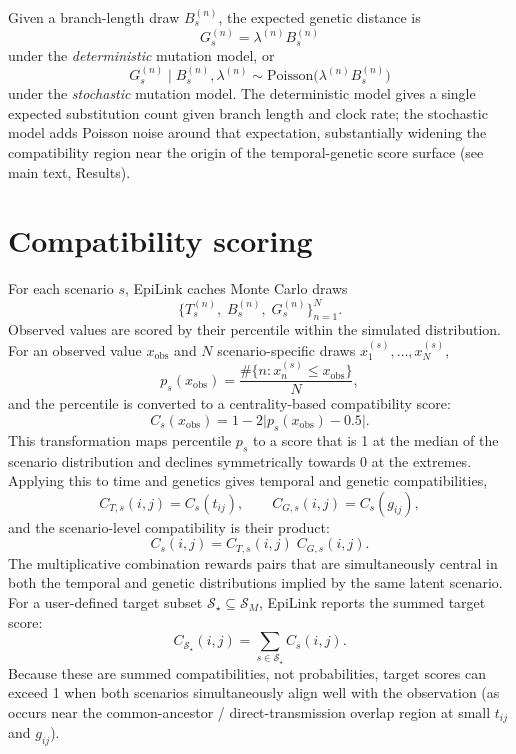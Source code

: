 \documentclass[11pt,a4paper]{article}
\begin{document}
Given a branch-length draw $B_s^{(n)}$, the expected genetic distance is
\[
G_s^{(n)} = \lambda^{(n)} B_s^{(n)}
\]
under the \emph{deterministic} mutation model, or
\[
G_s^{(n)} \mid B_s^{(n)}, \lambda^{(n)}
\sim \mathrm{Poisson}\!\bigl(\lambda^{(n)} B_s^{(n)}\bigr)
\]
under the \emph{stochastic} mutation model. The deterministic model gives a single expected substitution count given branch length and clock rate; the stochastic model adds Poisson noise around that expectation, substantially widening the compatibility region near the origin of the temporal-genetic score surface (see main text, Results).

\section{Compatibility scoring}
\label{sec:S1_scoring}

For each scenario $s$, EpiLink caches Monte Carlo draws
\[
\bigl\{T_s^{(n)},\; B_s^{(n)},\; G_s^{(n)}\bigr\}_{n=1}^{N}.
\]
Observed values are scored by their percentile within the simulated distribution. For an observed value $x_{\mathrm{obs}}$ and $N$ scenario-specific draws $x_1^{(s)},\ldots,x_N^{(s)}$,
\[
p_s(x_{\mathrm{obs}})
= \frac{\#\bigl\{n : x_n^{(s)} \le x_{\mathrm{obs}}\bigr\}}{N},
\]
and the percentile is converted to a centrality-based compatibility score:
\[
C_s(x_{\mathrm{obs}})
= 1 - 2\bigl|p_s(x_{\mathrm{obs}}) - 0.5\bigr|.
\]
This transformation maps percentile $p_s$ to a score that is 1 at the median of the scenario distribution and declines symmetrically towards 0 at the extremes. Applying this to time and genetics gives temporal and genetic compatibilities,
\[
C_{T,s}(i,j) = C_s(t_{ij}), \qquad
C_{G,s}(i,j) = C_s(g_{ij}),
\]
and the scenario-level compatibility is their product:
\[
C_s(i,j) = C_{T,s}(i,j)\; C_{G,s}(i,j).
\]
The multiplicative combination rewards pairs that are simultaneously central in both the temporal and genetic distributions implied by the same latent scenario. For a user-defined target subset $\mathcal{S}_\star \subseteq \mathcal{S}_M$, EpiLink reports the summed target score:
\[
C_{\mathcal{S}_\star}(i,j) = \sum_{s \in \mathcal{S}_\star} C_s(i,j).
\]
Because these are summed compatibilities, not probabilities, target scores can exceed 1 when both scenarios simultaneously align well with the observation (as occurs near the common-ancestor / direct-transmission overlap region at small $t_{ij}$ and $g_{ij}$).
\end{document}
